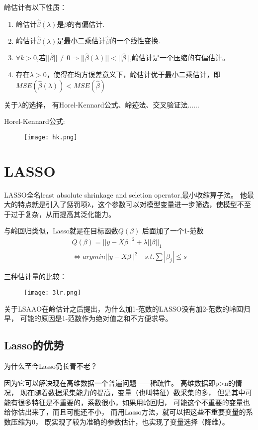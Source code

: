 \documentclass[12pt]{article}
\begin{document}
岭估计有以下性质：
\begin{enumerate}
	\item 岭估计$\hat{\beta}(\lambda)$是$\beta$的有偏估计.
	\item 岭估计$\hat{\beta}(\lambda)$是最小二乘估计$\hat{\beta}$的一个线性变换.
	\item $\forall k>0$,若$||\hat{\beta}||\neq 0\Longrightarrow ||\hat{\beta}(\lambda)||<||\hat{\beta}||$,岭估计是一个压缩的有偏估计。
	\item 存在$\lambda>0$，使得在均方误差意义下，岭估计优于最小二乘估计，即$MSE(\hat{\beta}(\lambda))<MSE(\hat{\beta})$
\end{enumerate}

关于$\lambda$的选择，
有Horel-Kennard公式、岭迹法、交叉验证法......

Horel-Kennard公式:
\begin{figure}[htbp]
	\centering
	\texttt{[image: hk.png]}
\end{figure}

\section{LASSO}

LASSO全名least absolute shrinkage and seletion operator,最小收缩算子法。
他最大的特点就是引入了惩罚项λ，这个参数可以对模型变量进一步筛选，使模型不至于过于复杂，从而提高其泛化能力。

与岭回归类似，Lasso就是在目标函数$Q(\beta)$ 后面加了一个1-范数
\begin{gather}
	Q(\beta)=||y-X\beta||^2+\lambda||\beta||_1\\
	\Leftrightarrow argmin||y-X\beta||^2 \quad s.t. \sum |\beta_j|\leq s
\end{gather}

三种估计量的比较：
\begin{figure}[htbp]
	\centering
	\texttt{[image: 3lr.png]}
\end{figure}

关于LSAAO在岭估计之后提出，为什么加1-范数的LASSO没有加2-范数的岭回归早，
可能的原因是1-范数作为绝对值之和不方便求导。

\subsection{Lasso的优势}

为什么至今Lasso仍长青不老？

因为它可以解决现在高维数据一个普遍问题——稀疏性。
高维数据即p>n的情况，
现在随着数据采集能力的提高，变量（也叫特征）数采集的多，
但是其中可能有很多特征是不重要的，系数很小，如果用岭回归，
可能这个不重要的变量也给你估出来了，而且可能还不小，
而用Lasso方法，就可以把这些不重要变量的系数压缩为0，
既实现了较为准确的参数估计，也实现了变量选择（降维）。
\end{document}
